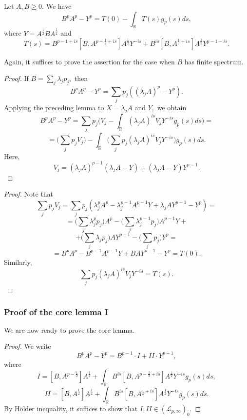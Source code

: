 \documentclass{beamer}
\theoremstyle{definition}
\begin{document}
\begin{frame}
\begin{lemma} Let $A,B\geq0.$ We have
$$B^pA^p-Y^p=T(0)-\int_{\mathbb{R}}T(s)g_p(s)ds,$$
where $Y=A^{\frac12}BA^{\frac12}$ and
$$T(s)=B^{p-1+is}[B,A^{p-\frac12+is}]A^{\frac12}Y^{-is}+B^{is}[B,A^{\frac12+is}]A^{\frac12}Y^{p-1-is}.$$
\end{lemma}
Again, it suffices to prove the assertion for the case when $B$ has finite spectrum.
\end{frame}

\begin{frame}
\begin{proof} If $B=\sum_j\lambda_jp_j,$ then
$$B^pA^p-Y^p=\sum_jp_j((\lambda_jA)^p-Y^p).$$
Applying the preceding lemma to $X=\lambda_jA$ and $Y,$ we obtain
$$B^pA^p-Y^p=\sum_jp_j\Big(V_j-\int_{\mathbb{R}}(\lambda_jA)^{is}V_jY^{-is}g_p(s)ds\Big)=$$
$$=\Big(\sum_jp_jV_j\Big)-\int_{\mathbb{R}}\Big(\sum_jp_j(\lambda_jA)^{is}V_jY^{-is}\Big)g_p(s)ds.$$
Here,
$$V_j=(\lambda_jA)^{p-1}(\lambda_jA-Y)+(\lambda_jA-Y)Y^{p-1}.$$
\end{proof}
\end{frame}

\begin{frame}
\begin{proof}
Note that
$$\sum_jp_jV_j=\sum_jp_j(\lambda_j^pA^p-\lambda_j^{p-1}A^{p-1}Y+\lambda_jAY^{p-1}-Y^p)=$$
$$=\Big(\sum_j\lambda_j^pp_j\Big)A^p-\Big(\sum_j\lambda_j^{p-1}p_j\Big)A^{p-1}Y+$$
$$+\Big(\sum_j\lambda_jp_j\Big)AY^{p-1}-\Big(\sum_jp_j\Big)Y^p=$$
$$=B^pA^p-B^{p-1}A^{p-1}Y+BAY^{p-1}-Y^p=T(0).$$
Similarly,
$$\sum_jp_j(\lambda_jA)^{is}V_jY^{-is}=T(s).$$
\end{proof}
\end{frame}

\begin{frame}
\frametitle{Proof of the core lemma I}
We are now ready to prove the core lemma.
\begin{proof} We write
$$B^pA^p-Y^p=B^{p-1}\cdot I+II\cdot Y^{p-1},$$
where
$$I=[B,A^{p-\frac12}]A^{\frac12}+\int_{\mathbb{R}}B^{is}[B,A^{p-\frac12+is}]A^{\frac12}Y^{-is}g_p(s)ds,$$
$$II=[B,A^{\frac12}]A^{\frac12}+\int_{\mathbb{R}}B^{is}[B,A^{\frac12+is}]A^{\frac12}Y^{-is}g_p(s)ds.$$
By H\"older inequality, it suffices to show that $I,II\in(\mathcal{L}_{p,\infty})_0.$
\end{proof}
\end{frame}
\end{document}
